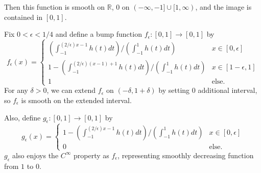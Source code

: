 \documentclass[a4paper, 12pt]{article}
\theoremstyle{Mydefinition}
\theoremstyle{Mytheorem}
\begin{document}
Then this function is smooth on $\mathbb{R}$, $0$ on $(-\infty, -1]\cup [1, \infty)$, and the image is contained in $[0,1]$.

Fix $0<\epsilon<1/4$ and define a bump function $f_\epsilon:[0,1]\rightarrow [0,1]$ by
\begin{equation}
    f_\epsilon(x) = \begin{cases}
    \left(\int_{-1}^{(2/\epsilon) x-1} h(t)dt\right)/\left(\int_{-1}^{1} h(t)dt\right) & x\in[0,\epsilon]\\
    1-\left(\int_{-1}^{(2/\epsilon) (x-1)+1} h(t)dt\right)/\left(\int_{-1}^{1} h(t)dt\right) & x\in[1-\epsilon,1]\\
    1 & \textrm{else}.
    \end{cases}
\end{equation}
For any $\delta>0$, we can extend $f_\epsilon$ on $(-\delta, 1+\delta)$ by setting $0$ additional interval, so $f_\epsilon$ is smooth on the extended interval.

Also, define $g_\epsilon:[0,1]\rightarrow [0,1]$ by
\begin{equation}
    g_\epsilon(x) = \begin{cases}
    1-\left(\int_{-1}^{(2/\epsilon) x-1} h(t)dt\right)/\left(\int_{-1}^{1} h(t)dt\right) & x\in[0,\epsilon]\\
    0 & \textrm{else}.
    \end{cases}
\end{equation}
$g_\epsilon$ also enjoys the $C^\infty$ property as $f_\epsilon$, representing smoothly decreasing function from $1$ to $0$.\\
\end{document}
